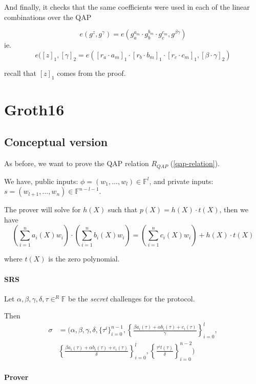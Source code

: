 \documentclass{article}
\begin{document}
And finally, it checks that the same coefficients were used in each of the linear combinations over the QAP

$$e(g^z, g^{\gamma}) = e(g_a^{a_m} \cdot g_b^{b_m} \cdot g_c^{c_m}, g^{\beta \gamma})$$
ie.
$$e([z]_1, [\gamma]_2 = e([r_a \cdot a_m]_1 \cdot [r_b \cdot b_m]_1 \cdot [r_c \cdot c_m]_1, [\beta \cdot \gamma]_2)$$

recall that $[z]_1$ comes from the proof.

\section{Groth16}

\subsection{Conceptual version}
As before, we want to prove the QAP relation $R_{QAP}$ (\ref{qap-relation}).

We have, public inputs: $\phi = (w_1, \ldots, w_l) \in \mathbb{F}^l$, and private inputs: $s = (w_{l+1}, \ldots, w_n) \in \mathbb{F}^{n-l-1}$.

The prover will solve for $h(X)$ such that $p(X)=h(X) \cdot t(X)$, then we have
$$
(\sum_{i=1}^n a_i(X) w_i) \cdot (\sum_{i=1}^n b_i(X) w_i) = (\sum_{i=1}^n c_i(X) w_i) + h(X) \cdot t(X)
$$

where $t(X)$ is the zero polynomial.

\paragraph{SRS}

Let $\alpha, \beta, \gamma, \delta, \tau \in^R \mathbb{F}$ be the \emph{secret} challenges for the protocol.

Then
\begin{align*}
    \sigma &= \Bigg(
	\alpha, \beta, \gamma, \delta, \{\tau^i \}_{i=0}^{n-1},
	\left\{ \frac{\beta a_i(\tau) + \alpha b_i(\tau) + c_i(\tau)}{\gamma} \right\}_{i=0}^l,\\
	   &\left\{ \frac{\beta a_i(\tau) + \alpha b_i(\tau) + c_i(\tau)}{\delta} \right\}_{i=0}^l,
	   \left\{ \frac{\tau^i t(\tau)}{\delta} \right\}_{i=0}^{n-2}
	\Bigg)
\end{align*}

\paragraph{Prover}
\end{document}
